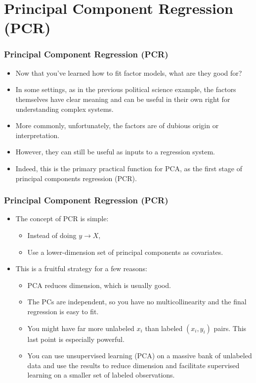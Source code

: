 \documentclass[
  shownotes,
  xcolor={svgnames},
  hyperref={colorlinks,citecolor=DarkBlue,linkcolor=DarkRed,urlcolor=DarkBlue}
  , aspectratio=169]{beamer}
\begin{document}
\section{Principal Component Regression (PCR)}
\begin{frame}[fragile]
\frametitle{ Principal Component Regression (PCR)}


\begin{itemize}
\item Now that you’ve learned how to fit factor models, what are they good for? 
\medskip
\item In some settings, as in the previous political science example, the factors themselves have clear meaning and can be useful in their own right for understanding complex systems.
\medskip
 \item More commonly, unfortunately, the factors are of dubious origin or interpretation. 
 \medskip
 \item  However, they can still be useful as inputs to a regression system. 
 \medskip
 \item  Indeed, this is the primary practical function for PCA, as the first stage of principal components regression (PCR).


\end{itemize}

\end{frame}
\begin{frame}[fragile]
\frametitle{ Principal Component Regression (PCR)}


\begin{itemize}
\item  The concept of PCR is simple: 
\begin{itemize}
  \item Instead of doing $y \rightarrow X$, 
  \medskip
  \item Use a lower-dimension set of principal components as covariates.
  \end{itemize}
  \medskip
  \item This is a fruitful strategy for a few reasons: 
  \medskip
\begin{itemize}
  \item PCA reduces dimension, which is usually good.
  \medskip
  \item The PCs are independent, so you have no multicollinearity and the final regression is easy to fit. 
  \medskip
  \item You might have far more unlabeled $x_i$ than labeled $(x_i, y_i)$ pairs. This last point is especially powerful. 
  \medskip
  \item You can use unsupervised learning (PCA) on a massive bank of unlabeled data and use the results to reduce dimension and facilitate supervised learning on a smaller set of labeled observations. 
\end{itemize}
\end{itemize}




\end{frame}
\end{document}

